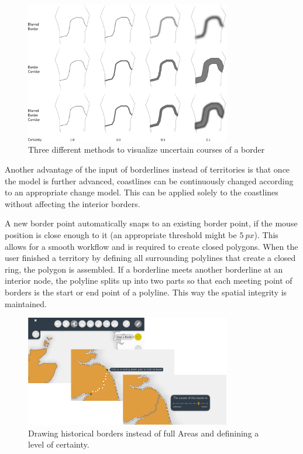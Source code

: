 \begin{figure}[ht]
  \vspace{1em}
  \centering
  \includegraphics[width = 0.8\textwidth]{graphics/extensions/border}
  \caption{Three different methods to visualize uncertain courses of a border}
  \label{fig:uncertainty_border}
\end{figure}

Another advantage of the input of borderlines instead of territories is that once the model is further advanced, coastlines can be continuously changed according to an appropriate change model. This can be applied solely to the coastlines without affecting the interior borders.

A new border point automatically snaps to an existing border point, if the mouse position is close enough to it (an appropriate threshold might be $5~px$). This allows for a smooth workflow and is required to create closed polygons. When the user finished a territory by defining all surrounding polylines that create a closed ring, the polygon is assembled. If a borderline meets another borderline at an interior node, the polyline splits up into two parts so that each meeting point of borders is the start or end point of a polyline. This way the spatial integrity is maintained.

\begin{figure}[ht]
  \vspace{1em}
  \centering
  \includegraphics[width = 0.8\textwidth]{graphics/extensions/new_territory_tool}
  \caption{Drawing historical borders instead of full Areas and definining a level of certainty.}
  \label{fig:uncertainty_new_territory_tool}
\end{figure}

